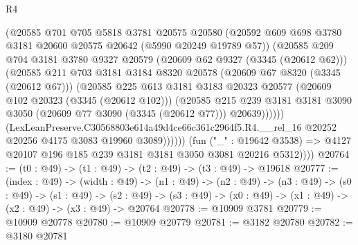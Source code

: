\begin{lexlean}{R4}
\begin{coremodule}
                      (@20585
                        @701
                        @705
                        @5818
                        @3781
                        @20575
                        @20580
                        (@20592
                          @609
                          @698
                          @3780
                          @3181
                          @20600
                          @20575
                          @20642
                          (@5990 @20249 @19789 @57))
                        (@20585
                          @209
                          @704
                          @3181
                          @3780
                          @9327
                          @20579
                          (@20609 @62 @9327 (@3345 (@20612 @62)))
                          (@20585
                            @211
                            @703
                            @3181
                            @3184
                            @8320
                            @20578
                            (@20609 @67 @8320 (@3345 (@20612 @67)))
                            (@20585
                              @225
                              @613
                              @3181
                              @3183
                              @20323
                              @20577
                              (@20609 @102 @20323 (@3345 (@20612 @102)))
                              (@20585
                                @215
                                @239
                                @3181
                                @3181
                                @3090
                                @3050
                                (@20609 @77 @3090 (@3345 (@20612 @77)))
                                @20639))))))
                    (LexLeanPreserve.C30568803e614a49d4ce66c361c2964f5.R4.__rel_16
                      @20252
                      @20256
                      @4175
                      @3083
                      @19960
                      @3089))))))
          (fun ("_" : @19642 @3538) =>
          @4127 @20107 @196 @185 @239 @3181 @3181 @3050 @3081 @20216 @5312))))
@20764 := (t0 : @49) -> (t1 : @49) -> (t2 : @49) -> (t3 : @49) -> @19618
@20777 := (index : @49) ->
  (width : @49) ->
  (n1 : @49) ->
  (n2 : @49) ->
  (n3 : @49) ->
  (s0 : @49) ->
  (s1 : @49) ->
  (s2 : @49) -> (s3 : @49) -> (x0 : @49) -> (x1 : @49) -> (x2 : @49) -> (x3 : @49) -> @20764
@20778 := @10909 @3781
@20779 := @10909 @20778
@20780 := @10909 @20779
@20781 := @3182 @20780
@20782 := @3180 @20781

\end{coremodule}
\end{lexlean}
